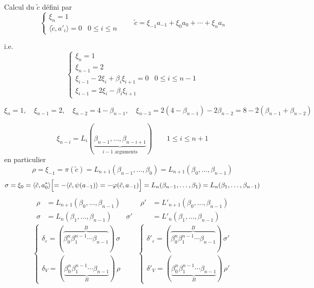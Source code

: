 \documentclass[11pt,a4paper]{article}
\begin{document}
Calcul du $\tilde{c}$ défini par
\[
\begin{cases}
\xi_n = 1 \\
\langle \tilde{c}, a'_i \rangle = 0 & 0 \leqslant i \leqslant n
\end{cases}
\qquad
\tilde{c} = \xi_{-1} a_{-1} + \xi_0 a_0 + \cdots + \xi_n a_n
\]

i.e.
\[
\begin{cases}
\xi_n = 1 \\
\xi_{n-1} = 2 \\
\xi_{i-1} - 2\xi_i + \beta_i \xi_{i+1} = 0 & 0 \leqslant i \leqslant n-1 \\
\xi_{i-1} = 2\xi_i - \beta_i \xi_{i+1}
\end{cases}
\]

\[
\xi_n = 1, \quad \xi_{n-1} = 2, \quad \xi_{n-2} = 4 - \beta_{n-1}, \quad
\xi_{n-3} = 2(4 - \beta_{n-1}) - 2\beta_{n-2} = 8 - 2(\beta_{n-1} + \beta_{n-2})
\]

\[
\boxed{\xi_{n-i} = L_i(\underbrace{\beta_{n-1}, \ldots, \beta_{n-i+1}}_{i-1 \text{ arguments}})}
\qquad 1 \leqslant i \leqslant n+1
\]
en particulier
\[
\rho = \xi_{-1} = \pi(\tilde{c}) = L_{n+1}(\beta_{n-1}, \ldots, \beta_0)
= L_{n+1}(\beta_0, \ldots, \beta_{n-1})
\]
\[
\sigma = \xi_0 = \langle \tilde{c}, a^{*}_0 \rangle
\Bigl[= -\langle \tilde{c}, \psi(a_{-1}) \rangle = -\varphi(\tilde{c}, a_{-1})
\Bigr]
= L_n(\beta_{n-1}, \ldots, \beta_1) = L_n(\beta_1, \ldots, \beta_{n-1})
\]
\[
\begin{aligned}
\rho &= L_{n+1}(\beta_0, \ldots, \beta_{n-1}) &\qquad \rho' &= L'_{n+1}(\beta_0, \ldots, \beta_{n-1}) \\
\sigma &= L_n(\beta_1, \ldots, \beta_{n-1}) & \sigma' &= L'_n(\beta_1, \ldots, \beta_{n-1})
\end{aligned}
\]
\[
\begin{cases}
\delta_\varepsilon = (\overbrace{\beta_0^n \beta_1^{n-1} \cdots \beta_{n-1}}^{B})\,\sigma \\
\delta_V = (\underbrace{\beta_0^n \beta_1^{n-1} \cdots \beta_{n-1}}_{B})\,\rho
\end{cases}
\qquad
\begin{cases}
\delta'_\varepsilon = (\overbrace{\beta_0^n \beta_1^{n-1} \cdots \beta_{n-1}}^{B})\,\sigma' \\
\delta'_V = (\underbrace{\beta_0^n \beta_1^{n-1} \cdots \beta_{n-1}}_{B})\,\rho'
\end{cases}
\]
\end{document}
